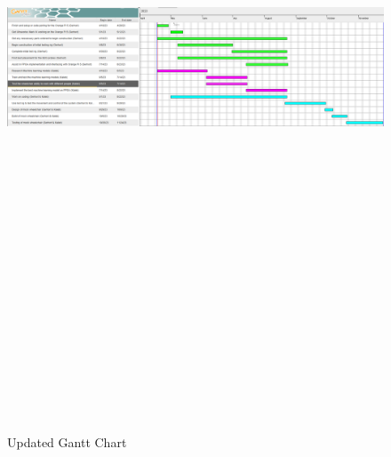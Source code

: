 \documentclass[conference]{IEEEtran}
\begin{document}
    \onecolumn
    \begin{figure}
        \centering
        \centerline{\includegraphics[angle=90,height=8.5in, keepaspectratio]{figs/E/updated_gantt.png}}
        \caption{Updated Gantt Chart}
        \label{fig:updated_gantt}
    \end{figure}
    \twocolumn





    
\end{document}
